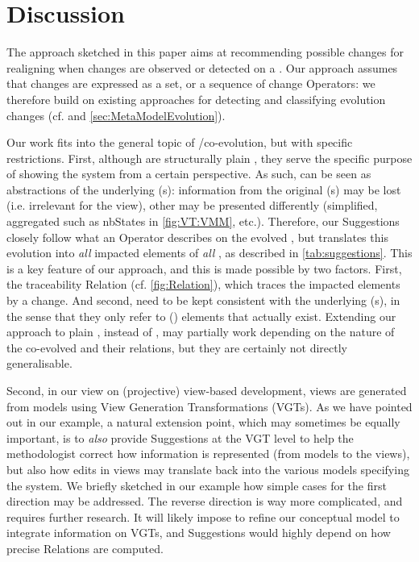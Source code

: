 \section{Discussion}
\label{sec:Discussion}

The approach sketched in this paper aims at recommending possible changes 
for realigning \viewtypes when changes are observed or detected on a 
\metamodel. Our approach assumes that \metamodel changes are expressed
as a set, or a sequence of change \textsf{Operator}s: we therefore build
on existing approaches for detecting and classifying evolution changes
(cf. \cite{herrmannsdoerfer_extensive_2011,khelladi_detecting_2015} and  \cref{sec:MetaModelEvolution}).

Our work fits into the general topic of \metamodel/\metamodel co-evolution,
but with specific restrictions. First, although \viewtypes are structurally 
plain \metamodels, they serve the specific purpose of showing the system from a 
certain perspective.
As such, \viewtypes can be seen as abstractions of the underlying \metamodel{}(s):
information from the original \metamodel{}(s) may be lost (i.e. irrelevant for 
the view), other may be presented differently (simplified, aggregated such as 
\textsf{nbStates} in \cref{fig:VT:VMM}, etc.). Therefore, our
\textsf{Suggestion}s closely follow what an \textsf{Operator} describes on
the evolved \metamodel, but translates this evolution into \emph{all} impacted
elements of \emph{all} \viewtypes, as described in \cref{tab:suggestions}.
This is a key feature of our approach, and this is made possible by two factors.
First, the traceability \textsf{Relation} (cf. \cref{fig:Relation}), which traces
the impacted \viewtype elements by a change. And second, \viewtypes need to be kept
consistent with the underlying \metamodel(s), in the sense that they only refer
to (\metamodel) elements that actually exist. 
Extending our approach to plain \metamodels, instead of \viewtypes, may partially
work depending on the nature of the co-evolved \metamodels and their relations, 
but they are certainly not directly generalisable.

Second, in our view on (projective) view-based development, views are generated
from models using View Generation Transformations (VGTs). As we have pointed out in our
example, a natural extension point, which may sometimes be equally important,
is to \emph{also} provide \textsf{Suggestion}s at the VGT level to help the
methodologist correct how information is represented (from models to the views),
but also how edits in views may translate back into the various models specifying
the system. We briefly sketched in our example how simple cases for the first 
direction may be addressed. The reverse direction is way more complicated, and 
requires further research. 
It will likely impose to refine our conceptual model to integrate information
on VGTs, and \textsf{Suggestion}s would highly depend on how precise 
\textsf{Relation}s are computed. 

